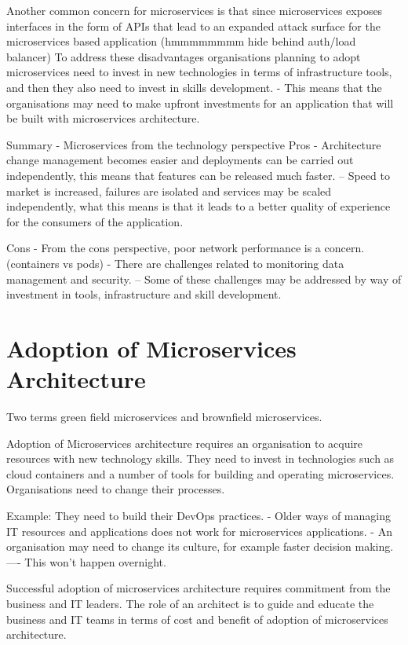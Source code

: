 Another common concern for microservices is that since microservices exposes interfaces in the form of APIs that lead to an expanded attack surface for the microservices based application (hmmmmmmmm hide behind auth/load balancer)
To address these disadvantages organisations planning to adopt microservices need to invest in new technologies in terms of infrastructure tools, and then they also need to invest in skills development.
- This means that the organisations may need to make upfront investments for an application that will be built with microservices architecture.


Summary - Microservices from the technology perspective
Pros
- Architecture change management becomes easier and deployments can be carried out independently, this means that features can be released much faster.
-- Speed to market is increased, failures are isolated and services may be scaled independently, what this means is that it leads to a better quality of experience for the consumers of the application.

Cons
- From the cons perspective, poor network performance is a concern. (containers vs pods)
- There are challenges related to monitoring data management and security.
-- Some of these challenges may be addressed by way of investment in tools, infrastructure and skill development.


\section{Adoption of Microservices Architecture}

Two terms green field microservices and brownfield microservices.

Adoption of Microservices architecture requires an organisation to acquire resources with new technology skills.
They need to invest in technologies such as cloud containers and a number of tools for building and operating microservices.
Organisations need to change their processes.

Example: They need to build their DevOps practices.
- Older ways of managing IT resources and applications does not work for microservices applications.
- An organisation may need to change its culture, for example faster decision making.
---- This won't happen overnight.

Successful adoption of microservices architecture requires commitment from the business and IT leaders.
The role of an architect is to guide and educate the business and IT teams in terms of cost and benefit of adoption of microservices architecture.

